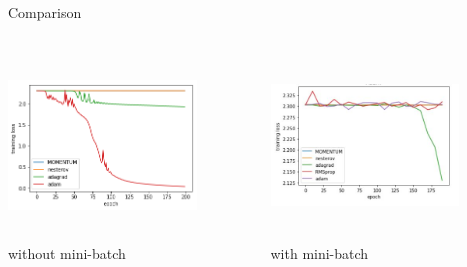 \documentclass{beamer}
\begin{document}
\begin{frame}{Comparison}
 \begin{columns}
    \begin{column}{0.47\textwidth}
          \includegraphics[width=5cm,height=5cm,angle=0]{mix_mini.png}\\
          \centering
          without mini-batch
    \end{column}
    \begin{column}{0.47\textwidth}
          \includegraphics[width=5cm,height=5cm,angle=0]{mix.png}\\
          \centering
          with mini-batch
    \end{column}
 \end{columns}
\end{frame}
\end{document}
